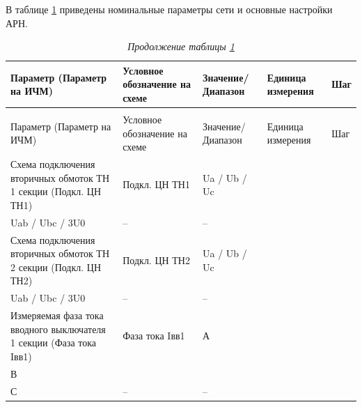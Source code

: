 \color{black}



\par
В таблице \ref{obsh:tbl1} приведены номинальные параметры сети и основные настройки АРН.

\footnotesize
\begin{longtable}{|>{\centering\arraybackslash}m{5.3cm}|>{\centering\arraybackslash}m{3.3cm}|>{\centering\arraybackslash}m{4.2cm}|>{\centering\arraybackslash}m{1.8cm}|>{\centering\arraybackslash}m{1cm}|}
\caption{Основные настройки и номинальные параметры сети\hfill\vspace{-0.5\baselineskip}}\label{obsh:tbl1}\\ 
\hline
\rowcolor{unimain!40}
Параметр (Параметр на ИЧМ) & Условное обозначение на схеме & Значение/ Диапазон & Единица измерения & Шаг \\ 
\hline
\endfirsthead
\caption*{\hspace{3pt}\emph{Продолжение таблицы \ref{obsh:tbl1}\hfill\vspace{-0.5\baselineskip}}} \\ %
\hline
\rowcolor{unimain!40}
Параметр (Параметр на ИЧМ) & Условное обозначение на схеме & Значение/ Диапазон & Единица измерения & Шаг \\ 
\endhead
\endfoot
\hline
\endlastfoot
\centering Схема подключения вторичных обмоток ТН 1 секции (Подкл. ЦН ТН1)  & \centering Подкл. ЦН ТН1 & \centering Ua / Ub / Uc \\ Uab / Ubc / 3U0 & \centering -- & \centering \arraybackslash -- \\
\hline
\centering Схема подключения вторичных обмоток ТН 2 секции (Подкл. ЦН ТН2)  & \centering Подкл. ЦН ТН2 & \centering Ua / Ub / Uc \\ Uab / Ubc / 3U0 & \centering -- & \centering \arraybackslash -- \\
\hline
\centering Измеряемая фаза тока вводного выключателя 1 секции (Фаза тока Iвв1)  & \centering Фаза тока Iвв1 & \centering А \\ В \\ С & \centering -- & \centering \arraybackslash -- \\

\end{longtable}

